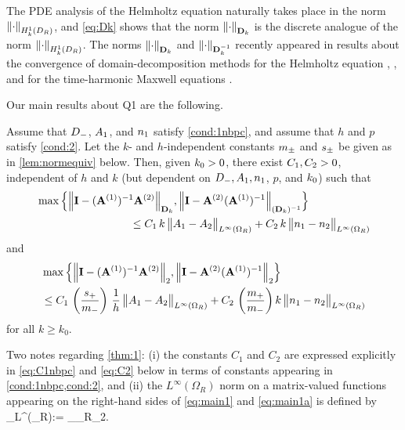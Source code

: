The PDE analysis of the Helmholtz equation naturally takes place in the norm $\NHokDR{\cdot}$, and \cref{eq:Dk} shows that the norm $\NDmatk{\cdot}$ is
the discrete analogue of the norm $\NHokDR{\cdot}$. %
The norms $\NDmatk{\cdot}$ and $\NDmatkI{\cdot}$ recently appeared in results about the convergence of domain-decomposition methods %
for the Helmholtz equation \cite{GrSpVa:17}, \cite{GrSpZo:18}, and for the time-harmonic Maxwell equations \cite{BoDoGrSpTo:19}. 

Our main results about Q1 are the following.

\begin{theorem}\label{thm:1}
Assume that $D_{-}$, $A_{1}$, and $n_{1}$ satisfy \cref{cond:1nbpc}, and assume that $h$ and $p$ satisfy \cref{cond:2}. 
Let the $k$- and $h$-independent constants $m_{\pm}$ and $s_{\pm}$ be given as in \cref{lem:normequiv} below.
Then, given $k_{0}>0$, there exist $C_{1}, C_{2}>0$, independent of $h$ and $k$ (but dependent on $D_{-}, A_{1}, n_{1}$, $p$, and $k_{0}$) such that
\begin{align}\nonumber
&\max\Big\{
\NDmatk{\Imat - (\Amat^{(1)})^{-1}\Amat^{(2)}}, 
\N{\Imat -\Amat^{(2)} (\Amat^{(1)})^{-1}}_{(\Dmat_k)^{-1}}
\Big\}\\
&\hspace{3cm} 
\leq C_1 \,k \,
\big\|\Ao-\At\big\|_{L^\infty(\Omega_R)} + C_2 \, k \, \big\|\no-\nt\big\|_{L^\infty(\Omega_R)}
\label{eq:main1}
\end{align}
and 
\begin{align}\nonumber
&\max\Big\{
\N{\Imat - (\Amat^{(1)})^{-1}\Amat^{(2)}}_2, 
\N{\Imat -\Amat^{(2)} (\Amat^{(1)})^{-1}}_2
\Big\}\\
&\hspace{0cm} 
\leq C_1 \,\left(\frac{s_+}{m_-}\right) \,\frac{1}{h} \,
\big\|\Ao-\At\big\|_{L^\infty(\Omega_R)} + C_2 \, \left(\frac{m_+}{m_-} \right)k \, \big\|\no-\nt\big\|_{L^\infty(\Omega_R)}
\label{eq:main1a}
\end{align}
for all $k\geq k_0$. 
\end{theorem}

Two notes regarding \cref{thm:1}: (i) the constants $C_1$ and $C_2$ are expressed explicitly in \cref{eq:C1nbpc} and \cref{eq:C2} below in terms of constants appearing in \cref{cond:1nbpc,cond:2}, and (ii) the $L^\infty(\Omega_R)$ norm on a matrix-valued functions appearing on the right-hand sides of \cref{eq:main1} and \cref{eq:main1a} is defined by
\beqs
{}_{L^\infty(\Omega_R)}:= \esssup_{\bx\in\Omega_R}_2.
\eeqs

